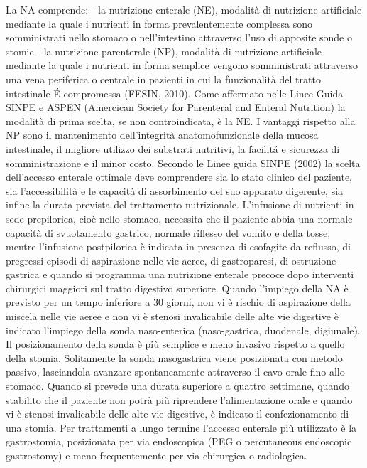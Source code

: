 \documentclass[11pt,a4paper,oneside]{book}
\begin{document}
La NA comprende:
- la nutrizione enterale (NE), modalit\`a di nutrizione artificiale mediante la quale i nutrienti in forma prevalentemente complessa sono somministrati nello stomaco o nell'intestino attraverso l'uso di apposite sonde o stomie
- la nutrizione parenterale (NP), modalit\`a di nutrizione artificiale mediante la quale i nutrienti in forma semplice vengono somministrati attraverso una vena periferica o centrale in pazienti in cui la funzionalit\`a del tratto intestinale \'E compromessa (FESIN, 2010).
Come affermato nelle Linee Guida SINPE e ASPEN (Amercican Society for Parenteral and Enteral Nutrition) la modalit\`a di prima scelta, se non controindicata, \`e la NE. I vantaggi rispetto alla NP sono il mantenimento dell'integrit\`a anatomofunzionale della mucosa intestinale, il migliore utilizzo dei substrati nutritivi, la facilit\'a e sicurezza di somministrazione e il minor costo. 
Secondo le Linee guida SINPE (2002) la scelta dell'accesso enterale ottimale deve comprendere sia lo stato clinico del paziente, sia l'accessibilit\`a e le capacit\`a di assorbimento del suo apparato digerente, sia infine la durata prevista del trattamento nutrizionale. 
L'infusione di nutrienti in sede prepilorica, cio\`e nello stomaco, necessita che il paziente abbia una normale capacit\`a di svuotamento gastrico, normale riflesso del vomito e della tosse; mentre l'infusione postpilorica \`e indicata in presenza di esofagite da reflusso, di pregressi episodi di aspirazione nelle vie aeree, di gastroparesi, di ostruzione gastrica e quando si programma una nutrizione enterale precoce dopo interventi chirurgici maggiori sul tratto digestivo superiore. 
Quando l'impiego della NA \`e previsto per un tempo inferiore a 30 giorni, non vi \`e rischio di aspirazione della miscela nelle vie aeree e non vi \`e stenosi invalicabile delle alte vie digestive \`e indicato l'impiego della sonda naso-enterica (naso-gastrica, duodenale, digiunale). 
Il posizionamento della sonda \`e pi\`u semplice e meno invasivo rispetto a quello della stomia. Solitamente la sonda nasogastrica viene posizionata con metodo passivo, lasciandola avanzare spontaneamente attraverso il cavo orale fino allo stomaco. 
Quando si prevede una durata superiore a quattro settimane, quando stabilito che il paziente non potr\`a pi\`u riprendere l'alimentazione orale e quando vi \`e stenosi invalicabile delle alte vie digestive, \`e indicato il confezionamento di una stomia.
Per trattamenti a lungo termine l'accesso enterale pi\`u utilizzato \`e la gastrostomia, posizionata per via endoscopica (PEG o percutaneous endoscopic gastrostomy) e meno frequentemente per via chirurgica o radiologica. 
\end{document}
